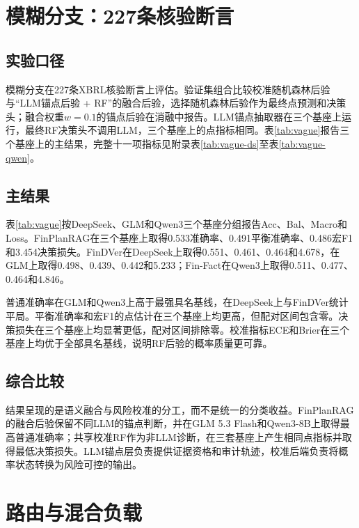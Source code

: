 

\section{模糊分支：227条核验断言}

\subsection{实验口径}

模糊分支在227条XBRL核验断言上评估。验证集组合比较校准随机森林后验与“LLM锚点后验 + RF”的融合后验，选择随机森林后验作为最终点预测和决策头；融合权重$w=0.1$的锚点后验在消融中报告。LLM锚点抽取器在三个基座上运行，最终RF决策头不调用LLM，三个基座上的点指标相同。表\ref{tab:vague}报告三个基座上的主结果，完整十一项指标见附录表\ref{tab:vague-ds}至表\ref{tab:vague-qwen}。

\subsection{主结果}

表\ref{tab:vague}按DeepSeek、GLM和Qwen3三个基座分组报告Acc、Bal、Macro和Loss。FinPlanRAG在三个基座上取得0.533准确率、0.491平衡准确率、0.486宏F1和3.454决策损失。FinDVer在DeepSeek上取得0.551、0.461、0.464和4.678，在GLM上取得0.498、0.439、0.442和5.233；Fin-Fact在Qwen3上取得0.511、0.477、0.464和4.846。

普通准确率在GLM和Qwen3上高于最强具名基线，在DeepSeek上与FinDVer统计平局。平衡准确率和宏F1的点估计在三个基座上均更高，但配对区间包含零。决策损失在三个基座上均显著更低，配对区间排除零。校准指标ECE和Brier在三个基座上均优于全部具名基线，说明RF后验的概率质量更可靠。



\subsection{综合比较}

结果呈现的是语义融合与风险校准的分工，而不是统一的分类收益。FinPlanRAG的融合后验保留不同LLM的锚点判断，并在GLM 5.3 Flash和Qwen3-8B上取得最高普通准确率；共享校准RF作为非LLM诊断，在三套基座上产生相同点指标并取得最低决策损失。LLM锚点层负责提供证据资格和审计轨迹，校准后端负责将概率状态转换为风险可控的输出。

\section{路由与混合负载}

